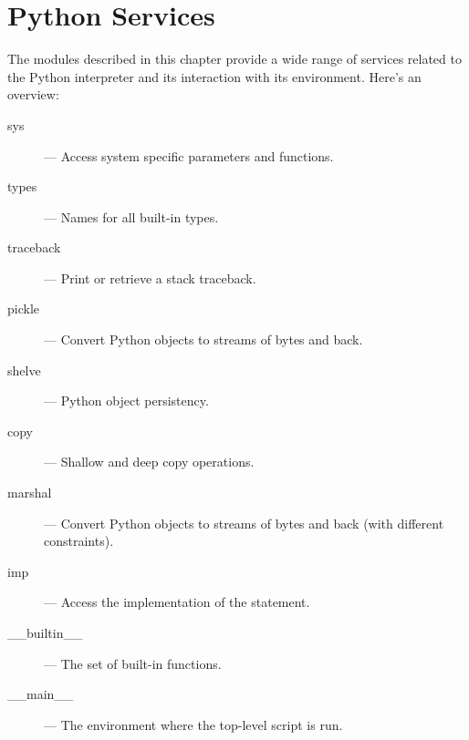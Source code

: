 \chapter{Python Services}

The modules described in this chapter provide a wide range of services
related to the Python interpreter and its interaction with its
environment.  Here's an overview:

\begin{description}

\item[sys]
--- Access system specific parameters and functions.

\item[types]
--- Names for all built-in types.

\item[traceback]
--- Print or retrieve a stack traceback.

\item[pickle]
--- Convert Python objects to streams of bytes and back.

\item[shelve]
--- Python object persistency.

\item[copy]
--- Shallow and deep copy operations.

\item[marshal]
--- Convert Python objects to streams of bytes and back (with
different constraints).

\item[imp]
--- Access the implementation of the  statement.

\item[__builtin__]
--- The set of built-in functions.

\item[__main__]
--- The environment where the top-level script is run.

\end{description}
